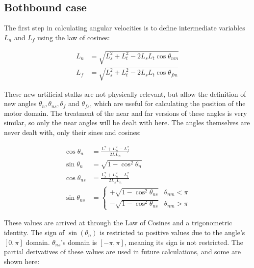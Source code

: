 \documentclass[9pt,twoside,lineno]{pnas-new}
\begin{document}
\subsection*{Bothbound case}
The first step in calculating angular velocities is to define intermediate variables $L_n$ and $L_f$ using the law of cosines:

\begin{align}
  L_n &= \sqrt{L_s^2 + L_t^2 - 2L_sL_t\cos{\theta_{nm}}} \\
  L_f &= \sqrt{L_s^2 + L_t^2 - 2L_sL_t\cos{\theta_{fm}}}
\end{align}

These new artificial stalks are not physically relevant, but allow the definition of new angles $\theta_n, \theta_{ns}, \theta_{f}$ and $\theta_{fs}$, which are useful for calculating the position of the motor domain. The treatment of the near and far versions of these angles is very similar, so only the near angles will be dealt with here. The angles themselves are never dealt with, only their sines and cosines:

\begin{align}
  \cos\theta_n &= \frac{L^2 + L_n^2 - L_f^2}{2L L_n} \\
  \sin\theta_{n} &= \sqrt{1 - \cos^2\theta_{n}} \\
  \cos\theta_{ns} &= \frac{L_s^2 + L_n^2 - L_t^2}{2L_s L_n} \\
  \sin\theta_{ns} &=
  \begin{cases}
    +\sqrt{1 - \cos^2\theta_{ns}} & \theta_{nm} < \pi \\
    -\sqrt{1 - \cos^2\theta_{ns}} & \theta_{nm} > \pi
  \end{cases}
\end{align}

These values are arrived at through the Law of Cosines and a trigonometric identity. The sign of $\sin\left(\theta_n\right)$ is restricted to positive values due to the angle's $[0,\pi]$ domain. $\theta_{ns}$'s domain is $[-\pi,\pi]$, meaning its sign is not restricted. The partial derivatives of these values are used in future calculations, and some are shown here:
\end{document}
